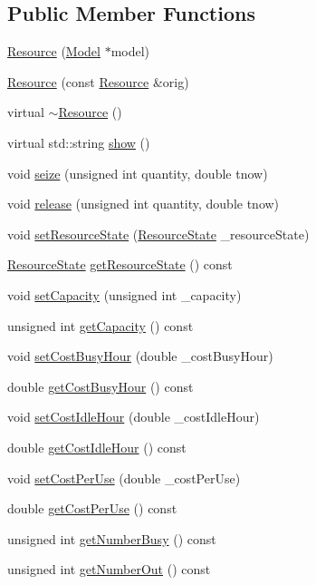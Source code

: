 \subsection*{Public Member Functions}
\begin{DoxyCompactItemize}
\item 
\hyperlink{class_resource_a1a8ae095067797fa47b0241ee278536c}{Resource} (\hyperlink{class_model}{Model} $\ast$model)
\item 
\hyperlink{class_resource_a30f2ca8f0617a6628ebd246b14b50566}{Resource} (const \hyperlink{class_resource}{Resource} \&orig)
\item 
virtual \hyperlink{class_resource_a0e5ec475e2601bdb33644468e86f6f10}{$\sim$\-Resource} ()
\item 
virtual std\-::string \hyperlink{class_resource_a593cf83404dc90706943b4e60213fd01}{show} ()
\item 
void \hyperlink{class_resource_a4c9cc891367f2af07511d8897255d625}{seize} (unsigned int quantity, double tnow)
\item 
void \hyperlink{class_resource_ad5da4dca5dd48a4818827e6273c20c2d}{release} (unsigned int quantity, double tnow)
\item 
void \hyperlink{class_resource_aba60047e3a2400f2aec478b1cfa3647e}{set\-Resource\-State} (\hyperlink{class_resource_af2224610b59962683d3cafbdac10621a}{Resource\-State} \-\_\-resource\-State)
\item 
\hyperlink{class_resource_af2224610b59962683d3cafbdac10621a}{Resource\-State} \hyperlink{class_resource_ac832a54ae1e20a2f7137aefd3a5fc003}{get\-Resource\-State} () const 
\item 
void \hyperlink{class_resource_aa8530e4507ab493de34feb4fef7d4d03}{set\-Capacity} (unsigned int \-\_\-capacity)
\item 
unsigned int \hyperlink{class_resource_a0aa3a9287571af52be298611580e661e}{get\-Capacity} () const 
\item 
void \hyperlink{class_resource_a28c348f8562fcf63e174229e9001f55c}{set\-Cost\-Busy\-Hour} (double \-\_\-cost\-Busy\-Hour)
\item 
double \hyperlink{class_resource_a66bd7e365c6ccb088afad2a6f24afdae}{get\-Cost\-Busy\-Hour} () const 
\item 
void \hyperlink{class_resource_aee4482e9f914b0b4e83cdb4ada50e45e}{set\-Cost\-Idle\-Hour} (double \-\_\-cost\-Idle\-Hour)
\item 
double \hyperlink{class_resource_a8033fb963bed0116f01af2b637bd4cad}{get\-Cost\-Idle\-Hour} () const 
\item 
void \hyperlink{class_resource_adedf8ae8388efb1a194441613647b669}{set\-Cost\-Per\-Use} (double \-\_\-cost\-Per\-Use)
\item 
double \hyperlink{class_resource_a93d303fba82b1ef9879cc75fbafef506}{get\-Cost\-Per\-Use} () const 
\item 
unsigned int \hyperlink{class_resource_a6fafa0b8da75c9596ca52932482a5568}{get\-Number\-Busy} () const 
\item 
unsigned int \hyperlink{class_resource_a1aedd0bf239010a6b7e2a6c15a324481}{get\-Number\-Out} () const 
\end{DoxyCompactItemize}

